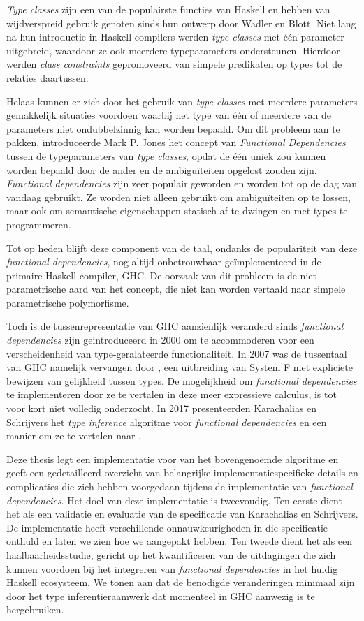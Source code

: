 \textit{Type classes} zijn een van de populairste functies van Haskell en hebben
van wijdverspreid gebruik genoten sinds hun ontwerp door Wadler en Blott.  Niet
lang na hun introductie in Haskell-compilers werden \textit{type classes} met
één parameter uitgebreid, waardoor ze ook meerdere typeparameters ondersteunen.
Hierdoor werden \textit{class constraints} gepromoveerd van simpele predikaten
op types tot de relaties daartussen.

Helaas kunnen er zich door het gebruik van \textit{type classes} met meerdere
parameters gemakkelijk situaties voordoen waarbij het type van één of meerdere
van de parameters niet ondubbelzinnig kan worden bepaald. Om dit probleem aan te
pakken, introduceerde Mark P. Jones het concept van \textit{Functional
Dependencies} tussen de typeparameters van \textit{type classes}, opdat de één
uniek zou kunnen worden bepaald door de ander en de ambiguïteiten opgelost
zouden zijn. \textit{Functional dependencies} zijn zeer populair geworden en
worden tot op de dag van vandaag gebruikt. Ze worden niet alleen gebruikt om
ambiguïteiten op te lossen, maar ook om semantische eigenschappen statisch af te
dwingen en met types te programmeren.

Tot op heden blijft deze component van de taal, ondanks de populariteit van deze
\textit{functional dependencies}, nog altijd onbetrouwbaar geïmplementeerd in de
primaire Haskell-compiler, GHC. De oorzaak van dit probleem is de
niet-parametrische aard van het concept, die niet kan worden vertaald naar
simpele parametrische polymorfisme.

Toch is de tussenrepresentatie van GHC aanzienlijk veranderd sinds
\textit{functional dependencies} zijn geintroduceerd in 2000 om te accommoderen
voor een verscheidenheid van type-geralateerde functionaliteit. In 2007 was de
tussentaal van GHC namelijk vervangen door \systemfc, een uitbreiding van System
F met expliciete bewijzen van gelijkheid tussen types.  De mogelijkheid om
\textit{functional dependencies} te implementeren door ze te vertalen in deze
meer expressieve calculus, is tot voor kort niet volledig onderzocht. In 2017
presenteerden Karachalias en Schrijvers het \textit{type inference} algoritme
voor \textit{functional dependencies} en een manier om ze te vertalen naar
\systemfc.

Deze thesis legt een implementatie voor van het bovengenoemde algoritme en geeft
een gedetailleerd overzicht van belangrijke implementatiespecifieke details en
complicaties die zich hebben voorgedaan tijdens de implementatie van
\textit{functional dependencies}.
%
Het doel van deze implementatie is tweevoudig.
%
Ten eerste dient het als een validatie en evaluatie van de specificatie van
Karachalias en Schrijvers. De implementatie heeft verschillende
onnauwkeurigheden in die specificatie onthuld en laten we
zien hoe we aangepakt hebben.
%
Ten tweede dient het als een haalbaarheidsstudie, gericht op het kwantificeren
van de uitdagingen die zich kunnen voordoen bij het integreren van
\textit{functional dependencies} in het huidig Haskell ecosysteem. We tonen aan
dat de benodigde veranderingen minimaal zijn door het type inferentieraamwerk
dat momenteel in GHC aanwezig is te hergebruiken.
